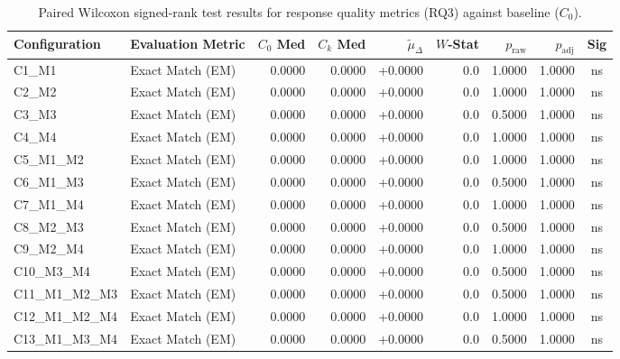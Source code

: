 \begin{table}[p]
\centering
\scriptsize
\setlength{\tabcolsep}{2.4pt}
\renewcommand{\arraystretch}{0.92}
\caption{Paired Wilcoxon signed-rank test results for response quality metrics (RQ3) against baseline ($C_0$).}
\label{tab:wilcoxon_rq3}
\begin{tabular*}{\textwidth}{@{\extracolsep{\fill}} l l r r r r r r c @{}}
\toprule
\textbf{Configuration} & \textbf{Evaluation Metric} & \textbf{$C_0$ Med} & \textbf{$C_k$ Med} & \textbf{$\tilde{\mu}_\Delta$} & \textbf{$W$-Stat} & \textbf{$p_{\text{raw}}$} & \textbf{$p_{\text{adj}}$} & \textbf{Sig} \\
\midrule
C1\_M1          & Exact Match (EM)     & 0.0000 & 0.0000 & +0.0000 & 0.0 & 1.0000 & 1.0000 & ns \\
\addlinespace
C2\_M2          & Exact Match (EM)     & 0.0000 & 0.0000 & +0.0000 & 0.0 & 1.0000 & 1.0000 & ns \\
\addlinespace
C3\_M3          & Exact Match (EM)     & 0.0000 & 0.0000 & +0.0000 & 0.0 & 0.5000 & 1.0000 & ns \\
\addlinespace
C4\_M4          & Exact Match (EM)     & 0.0000 & 0.0000 & +0.0000 & 0.0 & 1.0000 & 1.0000 & ns \\
\addlinespace
C5\_M1\_M2      & Exact Match (EM)     & 0.0000 & 0.0000 & +0.0000 & 0.0 & 1.0000 & 1.0000 & ns \\
\addlinespace
C6\_M1\_M3      & Exact Match (EM)     & 0.0000 & 0.0000 & +0.0000 & 0.0 & 0.5000 & 1.0000 & ns \\
\addlinespace
C7\_M1\_M4      & Exact Match (EM)     & 0.0000 & 0.0000 & +0.0000 & 0.0 & 1.0000 & 1.0000 & ns \\
\addlinespace
C8\_M2\_M3      & Exact Match (EM)     & 0.0000 & 0.0000 & +0.0000 & 0.0 & 0.5000 & 1.0000 & ns \\
\addlinespace
C9\_M2\_M4      & Exact Match (EM)     & 0.0000 & 0.0000 & +0.0000 & 0.0 & 1.0000 & 1.0000 & ns \\
\addlinespace
C10\_M3\_M4     & Exact Match (EM)     & 0.0000 & 0.0000 & +0.0000 & 0.0 & 0.5000 & 1.0000 & ns \\
\addlinespace
C11\_M1\_M2\_M3 & Exact Match (EM)     & 0.0000 & 0.0000 & +0.0000 & 0.0 & 0.5000 & 1.0000 & ns \\
\addlinespace
C12\_M1\_M2\_M4 & Exact Match (EM)     & 0.0000 & 0.0000 & +0.0000 & 0.0 & 1.0000 & 1.0000 & ns \\
\addlinespace
C13\_M1\_M3\_M4 & Exact Match (EM)     & 0.0000 & 0.0000 & +0.0000 & 0.0 & 0.5000 & 1.0000 & ns \\

\end{tabular*}
\end{table}
